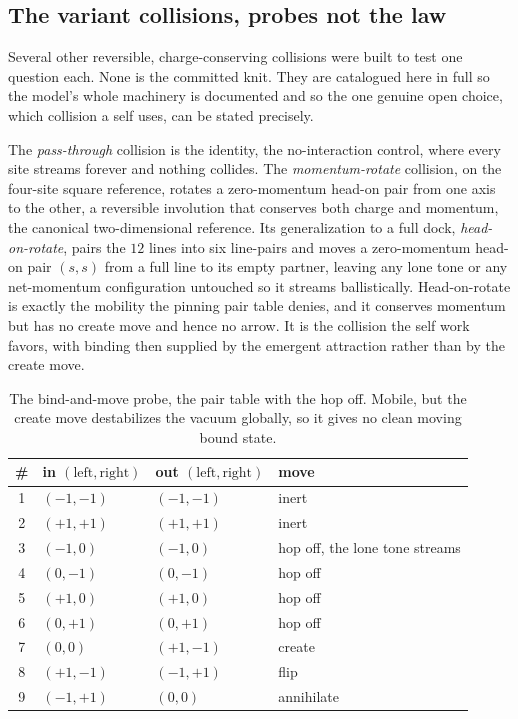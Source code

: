 \subsection{The variant collisions, probes not the law}

Several other reversible, charge-conserving collisions were built to test one question each. None is the committed knit. They are catalogued here in full so the model's whole machinery is documented and so the one genuine open choice, which collision a self uses, can be stated precisely.

The \emph{pass-through} collision is the identity, the no-interaction control, where every site streams forever and nothing collides. The \emph{momentum-rotate} collision, on the four-site square reference, rotates a zero-momentum head-on pair from one axis to the other, a reversible involution that conserves both charge and momentum, the canonical two-dimensional reference. Its generalization to a full dock, \emph{head-on-rotate}, pairs the $12$ lines into six line-pairs and moves a zero-momentum head-on pair $(s, s)$ from a full line to its empty partner, leaving any lone tone or any net-momentum configuration untouched so it streams ballistically. Head-on-rotate is exactly the mobility the pinning pair table denies, and it conserves momentum but has no create move and hence no arrow. It is the collision the self work favors, with binding then supplied by the emergent attraction rather than by the create move.

\begin{table}[ht]
\centering
\begin{tabular}{@{}cll l@{}}
\toprule
\# & in $(\mathrm{left}, \mathrm{right})$ & out $(\mathrm{left}, \mathrm{right})$ & move \\
\midrule
1 & $(-1, -1)$ & $(-1, -1)$ & inert \\
2 & $(+1, +1)$ & $(+1, +1)$ & inert \\
3 & $(-1, 0)$ & $(-1, 0)$ & hop off, the lone tone streams \\
4 & $(0, -1)$ & $(0, -1)$ & hop off \\
5 & $(+1, 0)$ & $(+1, 0)$ & hop off \\
6 & $(0, +1)$ & $(0, +1)$ & hop off \\
7 & $(0, 0)$ & $(+1, -1)$ & create \\
8 & $(+1, -1)$ & $(-1, +1)$ & flip \\
9 & $(-1, +1)$ & $(0, 0)$ & annihilate \\
\bottomrule
\end{tabular}
\caption{The bind-and-move probe, the pair table with the hop off. Mobile, but the create move destabilizes the vacuum globally, so it gives no clean moving bound state.}
\label{tab:bind-and-move}
\end{table}

